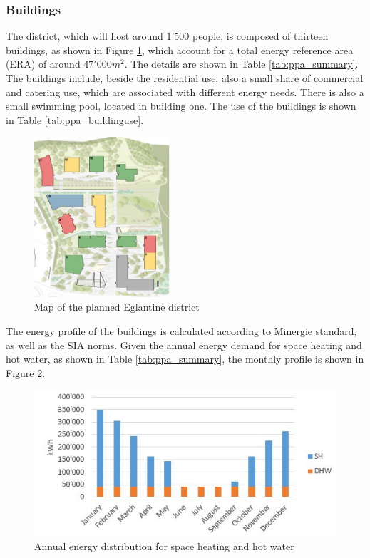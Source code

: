 \documentclass{article}
\begin{document}
\subsubsection{Buildings}
The district, which will host around 1'500 people, is composed of thirteen buildings, as shown in Figure \ref{fig:ppa_buildings}, which account for a total energy reference area (ERA) of around $47'000 m^{2}$. The details are shown in Table \ref{tab:ppa_summary}.\\
The buildings include, beside the residential use, also a small share of commercial and catering use, which are associated with different energy needs. There is also a small swimming pool, located in building one. The use of the buildings is shown in Table \ref{tab:ppa_buildinguse}.




\begin{figure}[h!]
\centering
\includegraphics[width=0.45\textwidth]{ppa_buildings.JPG}
\caption{Map of the planned Eglantine district}
\label{fig:ppa_buildings}
\end{figure}

The energy profile of the buildings is calculated according to Minergie standard, as well as the SIA norms. Given the annual energy demand for space heating and hot water, as shown in Table \ref{tab:ppa_summary}, the monthly profile is shown in Figure \ref{fig:ppa_energydemand}.

\begin{figure}[h!]
\centering
\includegraphics[width=1\textwidth]{ppa_energydemand.JPG}
\caption{Annual energy distribution for space heating and hot water}
\label{fig:ppa_energydemand}
\end{figure}
\end{document}
